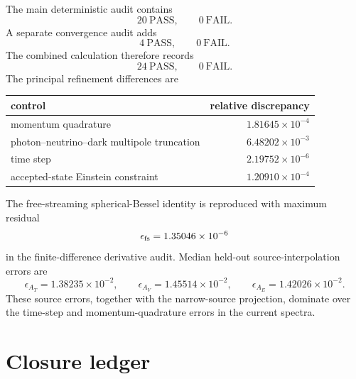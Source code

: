 The main deterministic audit contains
\begin{equation}
 \boxed{
 20\ \mathrm{PASS},
 \qquad
 0\ \mathrm{FAIL}.}
 \label{eq:pcmb-main-checks}
\end{equation}
A separate convergence audit adds
\begin{equation}
 \boxed{
 4\ \mathrm{PASS},
 \qquad
 0\ \mathrm{FAIL}.}
 \label{eq:pcmb-convergence-checks}
\end{equation}
The combined calculation therefore records
\begin{equation}
 \boxed{
 24\ \mathrm{PASS},
 \qquad
 0\ \mathrm{FAIL}.}
 \label{eq:pcmb-total-checks}
\end{equation}
The principal refinement differences are
\begin{center}
\begin{tabular}{lr}
\toprule
control & relative discrepancy\\
\midrule
momentum quadrature & $1.81645\times10^{-4}$\\
photon--neutrino--dark multipole truncation & $6.48202\times10^{-3}$\\
time step & $2.19752\times10^{-6}$\\
accepted-state Einstein constraint & $1.20910\times10^{-4}$\\
\bottomrule
\end{tabular}
\end{center}
The free-streaming spherical-Bessel identity is reproduced with maximum residual
\begin{equation}
 \epsilon_{\rm fs}=1.35046\times10^{-6}
 \label{eq:pcmb-free-streaming-residual}
\end{equation}
in the finite-difference derivative audit.  Median held-out source-interpolation errors are
\begin{equation}
 \epsilon_{A_T}=1.38235\times10^{-2},
 \qquad
 \epsilon_{A_V}=1.45514\times10^{-2},
 \qquad
 \epsilon_{A_E}=1.42026\times10^{-2}.
 \label{eq:pcmb-source-interpolation-errors}
\end{equation}
These source errors, together with the narrow-source projection, dominate over the time-step and momentum-quadrature errors in the current spectra.

\section{Closure ledger}

